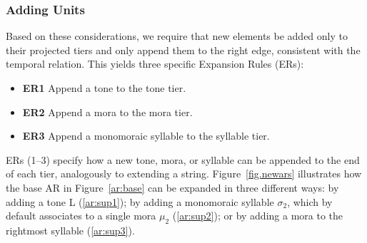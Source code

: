\subsubsection{Adding Units}
Based on these considerations, we require that new elements be added 
only to their projected tiers and only append them to the right 
edge, consistent with the temporal relation. This yields three specific
Expansion Rules (ERs):
\begin{itemize}
	\item \textbf{ER1} Append a tone to the tone tier.
	\item \textbf{ER2} Append a mora to the mora tier.
	\item \textbf{ER3} Append a monomoraic syllable to the syllable tier.
\end{itemize}
ERs (1–3) specify how a new tone, mora, or syllable can be appended 
to the end of each tier, analogously to extending a string.
Figure~\ref{fig.newars} illustrates how the base AR in 
Figure~\ref{ar:base} can be expanded in three different ways: by 
adding a tone L (\ref{ar:sup1}); by adding a monomoraic syllable $\sigma_2$, 
which by default associates to a single mora $\mu_2$ (\ref{ar:sup2}); 
or by adding a mora to the rightmost syllable (\ref{ar:sup3}).

